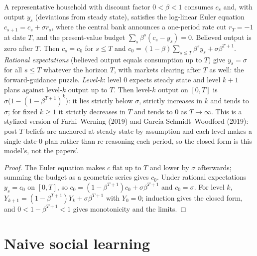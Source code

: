 \begin{theorem}
\label{thm:beh-levelk-fg}
\leanok
A representative household with discount factor $0<\beta<1$ consumes $c_s$ and, with output $y_s$ (deviations from
steady state), satisfies the log-linear Euler equation $c_{s+1}=c_s+\sigma r_s$, where the central bank announces a
one-period rate cut $r_T=-1$ at date $T$, and the present-value budget $\sum_s\beta^s(c_s-y_s)=0$. Believed output is
zero after $T$. Then $c_s=c_0$ for $s\le T$ and
$c_0=(1-\beta)\sum_{s\le T}\beta^s y_s+\sigma\beta^{T+1}$.
\emph{Rational expectations} (believed output equals consumption up to $T$) give $y_s=\sigma$ for all $s\le T$ whatever
the horizon $T$, with markets clearing after $T$ as well: the forward-guidance puzzle.
\emph{Level-$k$}: level $0$ expects steady state and level $k+1$ plans against level-$k$ output up to $T$. Then level-$k$
output on $[0,T]$ is $\sigma\bigl(1-(1-\beta^{T+1})^k\bigr)$: it lies strictly below $\sigma$, strictly increases in
$k$ and tends to $\sigma$; for fixed $k\ge1$ it strictly decreases in $T$ and tends to $0$ as $T\to\infty$.
This is a stylized version of Farhi--Werning (2019) and García-Schmidt--Woodford (2019): post-$T$ beliefs are anchored
at steady state by assumption and each level makes a single date-$0$ plan rather than re-reasoning each period, so the
closed form is this model's, not the papers'.
\end{theorem}
\begin{proof}
\leanok
The Euler equation makes $c$ flat up to $T$ and lower by $\sigma$ afterwards; summing the budget as a geometric series
gives $c_0$. Under rational expectations $y_s=c_0$ on $[0,T]$, so $c_0=(1-\beta^{T+1})c_0+\sigma\beta^{T+1}$ and
$c_0=\sigma$. For level $k$, $Y_{k+1}=(1-\beta^{T+1})Y_k+\sigma\beta^{T+1}$ with $Y_0=0$; induction gives the closed
form, and $0<1-\beta^{T+1}<1$ gives monotonicity and the limits.
\end{proof}

\section{Naive social learning}

